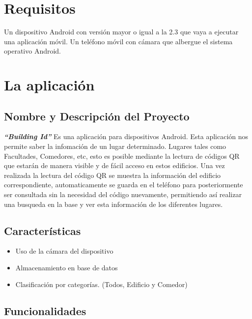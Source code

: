 \documentclass[a4paper,11pt]{article}
\begin{document}
\section{Requisitos}
Un dispositivo Android con versi\'{o}n mayor o igual a la 2.3 que vaya a ejecutar una aplicaci\'{o}n m\'{o}vil. 
\newline
Un tel\'{e}fono m\'{o}vil con c\'{a}mara que albergue el sistema operativo Android.
\newline
\newline
\section{La aplicaci\'{o}n}

\subsection{Nombre y Descripci\'{o}n del Proyecto}
\textbf{\textit{ ``Building Id''}}
Es una aplicaci\'{o}n para dispositivos Android. Esta aplicaci\'{o}n nos permite saber la infomaci\'{o}n de un lugar determinado. Lugares tales como Facultades, Comedores, etc, esto es posible mediante la lectura de c\'{o}digos QR que estar\'{a}n de manera visible y de f\'{a}cil acceso en estos edificios. 
\newline
\newline
Una vez realizada la lectura del c\'{o}digo QR se muestra la informaci\'{o}n del edificio correspondiente, automaticamente se guarda en el tel\'{e}fono para posteriormente ser consultada sin la necesidad del c\'{o}digo nuevamente, permitiendo as\'{i} realizar una \newline busqueda en la base y ver esta informaci\'{o}n de los diferentes lugares.
\newline
\newline
\subsection{Caracter\'{i}sticas}
\begin{itemize}
\item 
Uso de la c\'{a}mara del dispositivo
\item
Almacenamiento en base de datos
\item
Clasificaci\'{o}n por categor\'{i}as. (Todos, Edificio y Comedor)
\end{itemize}


\newpage

\subsection{Funcionalidades}
\end{document}
